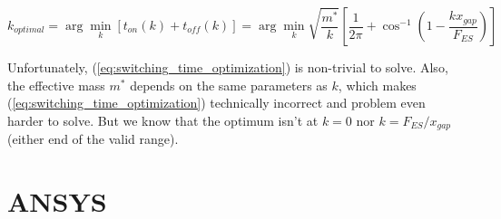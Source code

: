 \begin{equation}
    k_{optimal} = \arg\min_k \left[ t_{on}(k) + t_{off}(k) \right] = \arg\min_k \sqrt{\frac{m^*}{k}} \left[ \frac{1}{2\pi} + \cos^{-1}{\left( 1 - \frac{k x_{gap}}{F_{ES}} \right)} \right]
    \label{eq:switching_time_optimization}
\end{equation}

Unfortunately, (\ref{eq:switching_time_optimization}) is non-trivial to solve.
Also, the effective mass $m^*$ depends on the same parameters as $k$, which makes (\ref{eq:switching_time_optimization}) technically incorrect and problem even harder to solve.
But we know that the optimum isn't at $k=0$ nor $k=F_{ES}/x_{gap}$ (either end of the valid range).

\newpage
\section{ANSYS}
\lstset{basicstyle=\footnotesize\ttfamily,breaklines=true}

